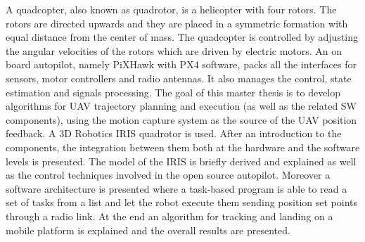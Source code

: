 

\begin{abstracts}

 A quadcopter, also known as quadrotor, is a helicopter with four rotors. The rotors are directed upwards and they are placed in a symmetric formation with equal distance from the center of mass. The quadcopter is controlled by adjusting the angular velocities of the rotors which are driven by electric motors. An on board autopilot, namely PiXHawk with PX4 software, packs all the interfaces for sensors, motor controllers and radio antennas. It also manages the control, state estimation and signals processing. The goal of this master thesis is to develop algorithms for UAV trajectory planning and execution (as well as the related SW components), using the motion capture system as the source of the UAV position feedback. A 3D Robotics IRIS quadrotor is used. After an introduction to the components, the integration between them both at the hardware and the software levels is presented. The model of the IRIS is briefly derived and explained as well as the control techniques involved in the open source autopilot. Moreover a software architecture is presented where a task-based program is able to read a set of tasks from a list and let the robot execute them sending position set points through a radio link. At the end an algorithm for tracking and landing on a mobile platform is explained and the overall results are presented.

\end{abstracts}